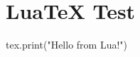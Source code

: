 \documentclass{article}
\begin{document}
\section*{LuaTeX Test}

\begin{luacode}
tex.print("Hello from Lua!")
\end{luacode}
\end{document}
